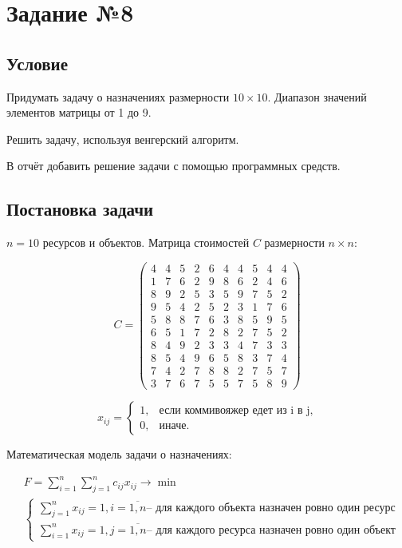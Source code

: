 \section{Задание №8}\label{08-lab}

\subsection{Условие}\label{08-lab-condition}

Придумать задачу о назначениях размерности $10 \times 10$. Диапазон значений элементов матрицы от 1 до 9.

Решить задачу, используя венгерский алгоритм.

В отчёт добавить решение задачи с помощью программных средств.

\subsection{Постановка задачи}\label{08-lab-statement}

$n = 10$ ресурсов и объектов. Матрица стоимостей $C$ размерности $n \times n$:

\[
    C = \begin{pmatrix}
        4 & 4 & 5 & 2 & 6 & 4 & 4 & 5 & 4 & 4 \\
        1 & 7 & 6 & 2 & 9 & 8 & 6 & 2 & 4 & 6 \\
        8 & 9 & 2 & 5 & 3 & 5 & 9 & 7 & 5 & 2 \\
        9 & 5 & 4 & 2 & 5 & 2 & 3 & 1 & 7 & 6 \\
        5 & 8 & 8 & 7 & 6 & 3 & 8 & 5 & 9 & 5 \\
        6 & 5 & 1 & 7 & 2 & 8 & 2 & 7 & 5 & 2 \\
        8 & 4 & 9 & 2 & 3 & 3 & 4 & 7 & 3 & 3 \\
        8 & 5 & 4 & 9 & 6 & 5 & 8 & 3 & 7 & 4 \\
        7 & 4 & 2 & 7 & 8 & 8 & 2 & 7 & 5 & 7 \\
        3 & 7 & 6 & 7 & 5 & 5 & 7 & 5 & 8 & 9
    \end{pmatrix}
\]

\[
    x_{ij} = \begin{cases}
        1, & \text{если коммивояжер едет из i в j}, \\
        0, & \text{иначе}.
    \end{cases}
\]

Математическая модель задачи о назначениях:

\begin{align*}
     & F = \sum\limits_{i=1}^{n} \sum\limits_{j=1}^{n} c_{ij} x_{ij} \to \min                                         \\
     & \begin{cases}
           \sum\limits_{j=1}^{n} x_{ij} = 1, i = \overline{1, n} \text{-- для каждого объекта назначен ровно один ресурс} \\
           \sum\limits_{i=1}^{n} x_{ij} = 1, j = \overline{1, n} \text{-- для каждого ресурса назначен ровно один объект}
       \end{cases}
\end{align*}

